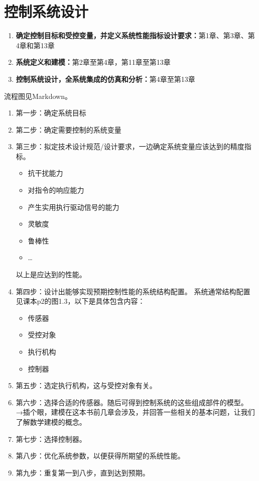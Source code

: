 \documentclass{NHNotebook}
\begin{document}
\section{控制系统设计}

\begin{tcolorbox}[colback=white,colframe=blue!70!green,colupper=blue!45!black,fonttitle=\bfseries,title=书中章节与控制系统的设计流程模块关系]
    \begin{enumerate}
        \item \textbf{确定控制目标和受控变量，并定义系统性能指标设计要求：}第1章、第3章、第4章和第13章
        \item \textbf{系统定义和建模：}第2章至第4章，第11章至第13章
        \item \textbf{控制系统设计，全系统集成的仿真和分析：}第4章至第13章
    \end{enumerate}
流程图见Markdown。
\end{tcolorbox}
\begin{enumerate}
    \item 第一步：确定系统目标
    \item 第二步：确定需要控制的系统变量
    \item 第三步：拟定技术设计规范/设计要求，一边确定系统变量应该达到的精度指标。
    \begin{itemize}    
        \item 抗干扰能力
        \item 对指令的响应能力
        \item 产生实用执行驱动信号的能力
        \item 灵敏度
        \item 鲁棒性
        \item \ldots
    \end{itemize}以上是应达到的性能。

    \item 第四步：设计出能够实现预期控制性能的系统结构配置。
    系统通常结构配置见课本p2的图1.3，以下是具体包含内容：
    \begin{itemize}
        \item 传感器
        \item 受控对象
        \item 执行机构
        \item 控制器
    \end{itemize}
    \item 第五步：选定执行机构，这与受控对象有关。
    \item 第六步：选择合适的传感器。随后可得到控制系统的这些组成部件的模型。
    →插个眼，建模在这本书前几章会涉及，并回答一些相关的基本问题，让我们了解数学建模的概念。
    \item 第七步：选择控制器。
    \item 第八步：优化系统参数，以便获得所期望的系统性能。
    \item 第九步：重复第一到八步，直到达到预期。
\end{enumerate}
\end{document}
